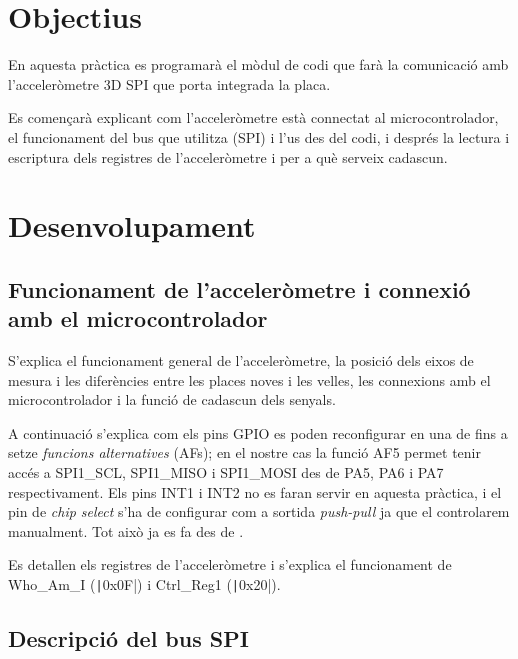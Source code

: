 
\section{Objectius}

En aquesta pràctica es programarà el mòdul de codi que farà la comunicació
amb l'acceleròmetre 3D SPI que porta integrada la placa.

Es començarà explicant com l'acceleròmetre està connectat al microcontrolador,
el funcionament del bus que utilitza (SPI) i l'us des del codi, i després
la lectura i escriptura dels registres de l'acceleròmetre i per a què serveix
cadascun.

\section{Desenvolupament}


\subsection{Funcionament de l’acceleròmetre i connexió amb el microcontrolador}

S'explica el funcionament general de l'acceleròmetre, la posició dels eixos de mesura
i les diferències entre les places noves i les velles, les connexions amb el
microcontrolador i la funció de cadascun dels senyals.

A continuació s'explica com els pins GPIO es poden reconfigurar en una de fins a setze
\emph{funcions alternatives} (AFs); en el nostre cas la funció AF5 permet tenir accés a
\textsf{SPI1\_SCL}, \textsf{SPI1\_MISO} i \textsf{SPI1\_MOSI} des de \textsf{PA5}, \textsf{PA6}
i \textsf{PA7} respectivament. Els pins \textsf{INT1} i \textsf{INT2} no es faran servir
en aquesta pràctica, i el pin de \emph{chip select} s'ha de configurar com a sortida \emph{push-pull}
ja que el controlarem manualment. Tot això ja es fa des de .

Es detallen els registres de l'acceleròmetre i s'explica el funcionament de \textsf{Who\_Am\_I}
(\texttt|0x0F|) i \textsf{Ctrl\_Reg1} (\texttt|0x20|).

\subsection{Descripció del bus SPI}


